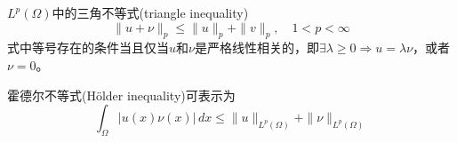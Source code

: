 \begin{definition}[三角不等式]
  $L^p(\Omega)$中的三角不等式(triangle inequality) 
  \begin{equation*}
  \| u + \nu \|_p \le \| u \|_p + \| v \|_p, \quad 1 < p < \infty
  \end{equation*}
式中等号存在的条件当且仅当$u$和$\nu$是严格线性相关的，即$ \exists \lambda \ge 0 \Rightarrow u = \lambda \nu$，或者$\nu = 0$。
\end{definition}

\begin{definition}[霍德尔不等式]
  \label{definition:hoelder-inequality-def}
  霍德尔不等式(Hölder inequality)可表示为
  \begin{equation*}
    \int_{\Omega} \left| u(x) \nu(x) \right| \, dx \le \|u\|_{L^p(\Omega)} + \|\nu\|_{L^p(\Omega)}
  \end{equation*}
\end{definition}

